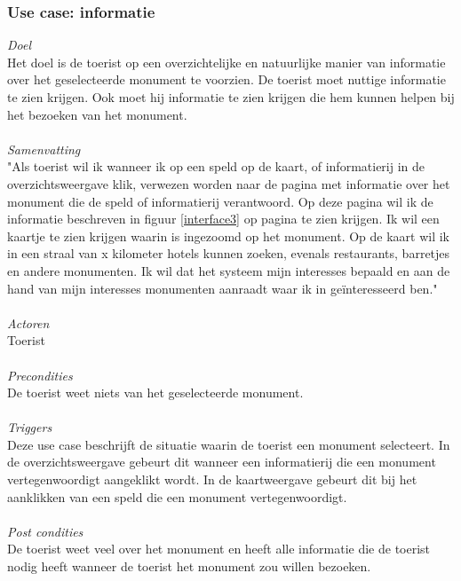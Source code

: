 \documentclass[a4paper,10pt]{article}
\newcommand{\rsubsubsection}[1]{
\subsubsection{#1}\label{sec:sub:sub:#1}
}
\begin{document}
			\rsubsubsection{Use case: informatie}
			\textit{Doel}\\
			Het doel is de toerist op een overzichtelijke en natuurlijke manier van informatie over het geselecteerde monument te voorzien. De toerist moet nuttige informatie te zien krijgen. Ook moet hij informatie te zien krijgen die hem kunnen helpen bij het bezoeken van het monument.\\ \\
			\textit{Samenvatting}\\
			"Als toerist wil ik wanneer ik op een speld op de kaart, of informatierij in de overzichtsweergave klik, verwezen worden naar de pagina met informatie over het monument die de speld of informatierij verantwoord. Op deze pagina wil ik de informatie beschreven in figuur \ref{interface3} op pagina \pageref{interface3} te zien krijgen. Ik wil een kaartje te zien krijgen waarin is ingezoomd op het monument. Op de kaart wil ik in een straal van x kilometer hotels kunnen zoeken, evenals restaurants, barretjes en andere monumenten. Ik wil dat het systeem mijn interesses bepaald en aan de hand van mijn interesses monumenten aanraadt waar ik in ge\"interesseerd ben."\\ \\
			\textit{Actoren}\\
			Toerist\\ \\
			\textit{Precondities}\\
			De toerist weet niets van het geselecteerde monument.\\ \\
			\textit{Triggers}\\
			Deze use case beschrijft de situatie waarin de toerist een monument selecteert. In de overzichtsweergave gebeurt dit wanneer een informatierij die een monument vertegenwoordigt aangeklikt wordt. In de kaartweergave gebeurt dit bij het aanklikken van een speld die een monument vertegenwoordigt.\\ \\
			\textit{Post condities}\\
			De toerist weet veel over het monument en heeft alle informatie die de toerist nodig heeft wanneer de toerist het monument zou willen bezoeken.	
			
\end{document}
